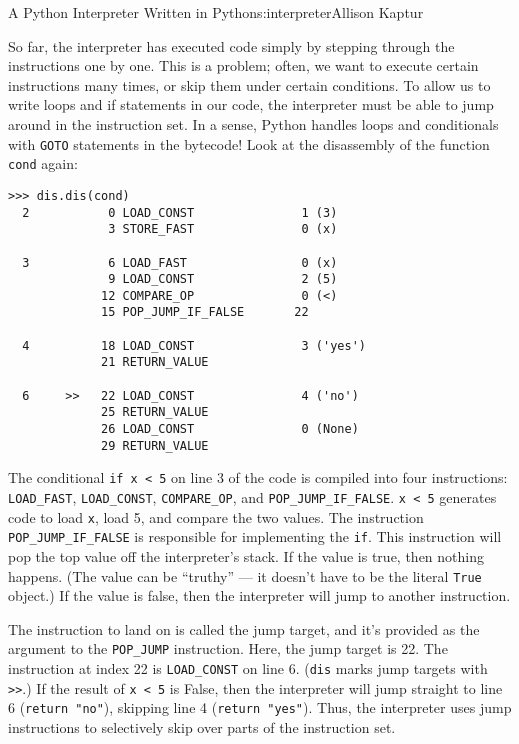 \begin{aosachapter}{A Python Interpreter Written in Python}{s:interpreter}{Allison Kaptur}
\label{conditionals-and-loops}

So far, the interpreter has executed code simply by stepping through the
instructions one by one. This is a problem; often, we want to execute
certain instructions many times, or skip them under certain conditions.
To allow us to write loops and if statements in our code, the
interpreter must be able to jump around in the instruction set. In a
sense, Python handles loops and conditionals with \texttt{GOTO}
statements in the bytecode! Look at the disassembly of the function
\texttt{cond} again:

\begin{verbatim}
>>> dis.dis(cond)
  2           0 LOAD_CONST               1 (3)
              3 STORE_FAST               0 (x)

  3           6 LOAD_FAST                0 (x)
              9 LOAD_CONST               2 (5)
             12 COMPARE_OP               0 (<)
             15 POP_JUMP_IF_FALSE       22

  4          18 LOAD_CONST               3 ('yes')
             21 RETURN_VALUE

  6     >>   22 LOAD_CONST               4 ('no')
             25 RETURN_VALUE
             26 LOAD_CONST               0 (None)
             29 RETURN_VALUE
\end{verbatim}

The conditional \texttt{if x \textless{} 5} on line 3 of the code is
compiled into four instructions: \texttt{LOAD\_FAST},
\texttt{LOAD\_CONST}, \texttt{COMPARE\_OP}, and
\texttt{POP\_JUMP\_IF\_FALSE}. \texttt{x \textless{} 5} generates code
to load \texttt{x}, load 5, and compare the two values. The instruction
\texttt{POP\_JUMP\_IF\_FALSE} is responsible for implementing the
\texttt{if}. This instruction will pop the top value off the
interpreter's stack. If the value is true, then nothing happens. (The
value can be ``truthy'' --- it doesn't have to be the literal
\texttt{True} object.) If the value is false, then the interpreter will
jump to another instruction.

The instruction to land on is called the jump target, and it's provided
as the argument to the \texttt{POP\_JUMP} instruction. Here, the jump
target is 22. The instruction at index 22 is \texttt{LOAD\_CONST} on
line 6. (\texttt{dis} marks jump targets with
\texttt{\textgreater{}\textgreater{}}.) If the result of
\texttt{x \textless{} 5} is False, then the interpreter will jump
straight to line 6 (\texttt{return "no"}), skipping line 4
(\texttt{return "yes"}). Thus, the interpreter uses jump instructions to
selectively skip over parts of the instruction set.


\end{aosachapter}
